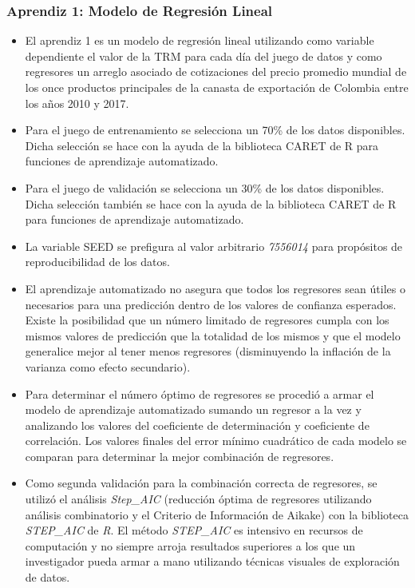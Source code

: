 \subsubsection{Aprendiz 1: Modelo de Regresión Lineal}
\begin{itemize}
	\item El aprendiz 1 es un modelo de regresión lineal utilizando como variable dependiente el valor de la TRM para cada día del juego de datos y como regresores un arreglo asociado de cotizaciones del precio promedio mundial de los once productos principales de la canasta de exportación de Colombia entre los años 2010 y 2017.
	\item Para el juego de entrenamiento se selecciona un 70\% de los datos disponibles. Dicha selección se hace con la ayuda de la biblioteca CARET de R para funciones de aprendizaje automatizado. 
	\item Para el juego de validación se selecciona un 30\% de los datos disponibles. Dicha selección también se hace con la ayuda de la biblioteca CARET de R para funciones de aprendizaje automatizado. 
	\item La variable SEED se prefigura al valor arbitrario \emph{7556014} para propósitos de reproducibilidad de los datos. 
	\item El aprendizaje automatizado no asegura que todos los regresores sean útiles o necesarios para una predicción dentro de los valores de confianza esperados. Existe la posibilidad que un número limitado de regresores cumpla con los mismos valores de predicción que la totalidad de los mismos y que el modelo generalice mejor al tener menos regresores (disminuyendo la inflación de la varianza como efecto secundario). 
	\item Para determinar el número óptimo de regresores se procedió a armar el modelo de aprendizaje automatizado sumando un regresor a la vez y analizando los valores del coeficiente de determinación y coeficiente de correlación. Los valores finales del error mínimo cuadrático de cada modelo se comparan para determinar la mejor combinación de regresores. 
	\item Como segunda validación para la combinación correcta de regresores, se utilizó el análisis \emph{Step\_AIC} (reducción óptima de regresores utilizando análisis combinatorio y el Criterio de Información de Aikake) con la biblioteca \emph{STEP\_AIC} de \emph{R}. El método \emph{STEP\_AIC} es intensivo en recursos de computación y no siempre arroja resultados superiores a los que un investigador pueda armar a mano utilizando técnicas visuales de exploración de datos.
\end{itemize}

